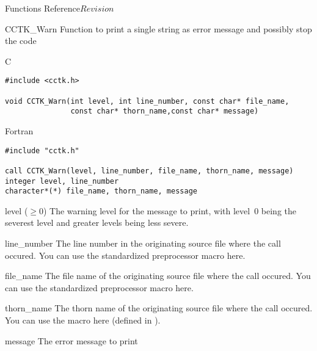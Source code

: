 \begin{cactuspart}{ Functions Reference}{}{$Revision$}
\begin{FunctionDescription}{CCTK\_Warn}
\label{CCTK-Warn}
Function to print a single string as error message and possibly stop the code

\begin{SynopsisSection}
\begin{Synopsis}{C}
\begin{verbatim}
#include <cctk.h>

void CCTK_Warn(int level, int line_number, const char* file_name,
               const char* thorn_name,const char* message)
\end{verbatim}
\end{Synopsis}
\begin{Synopsis}{Fortran}
\begin{verbatim}
#include "cctk.h"

call CCTK_Warn(level, line_number, file_name, thorn_name, message)
integer level, line_number
character*(*) file_name, thorn_name, message
\end{verbatim}
\end{Synopsis}
\end{SynopsisSection}

\begin{ParameterSection}
\begin{Parameter}{level ($\ge 0$)}
The warning level for the message to print, with level~0 being the
severest level and greater levels being less severe.
\end{Parameter}
\begin{Parameter}{line\_number}
The line number in the originating source file where the  call
occured. You can use the standardized  preprocessor macro here.
\end{Parameter}
\begin{Parameter}{file\_name}
The file name of the originating source file where the  call
occured. You can use the standardized  preprocessor macro here.
\end{Parameter}
\begin{Parameter}{thorn\_name}
The thorn name of the originating source file where the  call occured. You can use the  macro here (defined in ).
\end{Parameter}
\begin{Parameter}{message}
The error message to print
\end{Parameter}
\end{ParameterSection}


\end{FunctionDescription}
\end{cactuspart}
